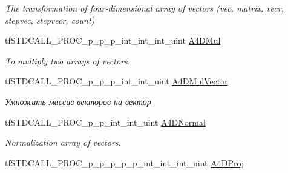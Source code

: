 \begin{DoxyCompactItemize}
\begin{DoxyCompactList}\small\item\em The transformation of four-\/dimensional array of vectors (vec, matrix, vecr, stepvec, stepvecr, count) \end{DoxyCompactList}\item 
\hypertarget{structs_functions_array_vector_c_p_u_ada12cd9ac5d364a6f25a74b3897f9b68}{tf\-S\-T\-D\-C\-A\-L\-L\-\_\-\-P\-R\-O\-C\-\_\-p\-\_\-p\-\_\-p\-\_\-int\-\_\-int\-\_\-int\-\_\-uint \hyperlink{structs_functions_array_vector_c_p_u_ada12cd9ac5d364a6f25a74b3897f9b68}{A4\-D\-Mul}}\label{structs_functions_array_vector_c_p_u_ada12cd9ac5d364a6f25a74b3897f9b68}

\begin{DoxyCompactList}\small\item\em To multiply two arrays of vectors. \end{DoxyCompactList}\item 
\hypertarget{structs_functions_array_vector_c_p_u_a6a42cd77c5053aaca36fd1bb74fbb086}{tf\-S\-T\-D\-C\-A\-L\-L\-\_\-\-P\-R\-O\-C\-\_\-p\-\_\-p\-\_\-p\-\_\-int\-\_\-int\-\_\-uint \hyperlink{structs_functions_array_vector_c_p_u_a6a42cd77c5053aaca36fd1bb74fbb086}{A4\-D\-Mul\-Vector}}\label{structs_functions_array_vector_c_p_u_a6a42cd77c5053aaca36fd1bb74fbb086}

\begin{DoxyCompactList}\small\item\em Умножить массив векторов на вектор \end{DoxyCompactList}\item 
\hypertarget{structs_functions_array_vector_c_p_u_a3d3292085fb4cb46ebead65042bbaec0}{tf\-S\-T\-D\-C\-A\-L\-L\-\_\-\-P\-R\-O\-C\-\_\-p\-\_\-p\-\_\-int\-\_\-int\-\_\-uint \hyperlink{structs_functions_array_vector_c_p_u_a3d3292085fb4cb46ebead65042bbaec0}{A4\-D\-Normal}}\label{structs_functions_array_vector_c_p_u_a3d3292085fb4cb46ebead65042bbaec0}

\begin{DoxyCompactList}\small\item\em Normalization array of vectors. \end{DoxyCompactList}\item 
\hypertarget{structs_functions_array_vector_c_p_u_abce9f60397a42254e6ab963fef131367}{tf\-S\-T\-D\-C\-A\-L\-L\-\_\-\-P\-R\-O\-C\-\_\-p\-\_\-p\-\_\-p\-\_\-p\-\_\-p\-\_\-int\-\_\-int\-\_\-int\-\_\-uint \hyperlink{structs_functions_array_vector_c_p_u_abce9f60397a42254e6ab963fef131367}{A4\-D\-Proj}}\label{structs_functions_array_vector_c_p_u_abce9f60397a42254e6ab963fef131367}


\end{DoxyCompactItemize}
